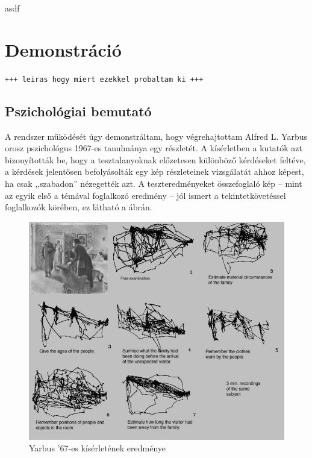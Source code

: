 asdf

\section{Demonstráció}\label{sect:kiserletek}

\texttt{+++ leiras hogy miert ezekkel probaltam ki +++}

\subsection{Pszichológiai bemutató}\label{sect:pszicho}

A rendszer működését úgy demonstráltam, hogy végrehajtottam Alfred L. Yarbus orosz pszichológus 1967-es tanulmánya egy részletét. A kísérletben a kutatók azt bizonyították be, hogy a tesztalanyoknak előzetesen különböző kérdéseket feltéve, a kérdések jelentősen befolyásolták egy kép részleteinek vizsgálatát ahhoz képest, ha csak ,,szabadon'' nézegették azt. A teszteredményeket összefoglaló kép -- mint az egyik első a témával foglalkozó eredmény -- jól ismert a tekintetkövetéssel foglalkozók körében, ez látható a  ábrán.

\begin{figure}[!ht]
\centering
\includegraphics[width=140mm, keepaspectratio]{figures/yarbus.jpg}
\caption{Yarbus '67-es kísérletének eredménye}
\label{fig:yarbus}
\end{figure}

